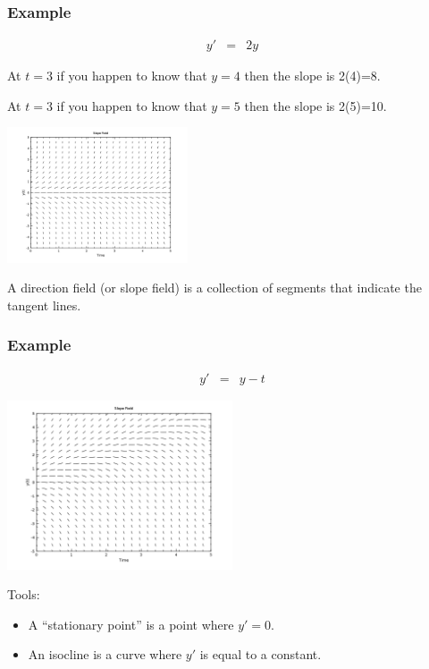 \begin{frame}
  \frametitle{Example}

  \vspace*{-4em}

  \begin{eqnarray*}
    y' & = & 2y
  \end{eqnarray*}

  At $t=3$ if you happen to know that $y=4$ then the slope is 2(4)=8.

  At $t=3$ if you happen to know that $y=5$ then the slope is 2(5)=10.

  \includegraphics[height=4cm]{img/week1Day2SlopeField}

  {\color{red}A direction field (or slope field) is a collection of 
  segments that indicate the tangent lines.} 
  
\end{frame}


\begin{frame}
  \frametitle{Example}

  \vspace*{-4em}

  \begin{eqnarray*}
    y' & = & y - t
  \end{eqnarray*}

  \includegraphics[height=5cm]{img/week1Day2SlopeField2}

  Tools:
  \begin{itemize}
  \item A ``{\color{red}stationary point}'' is a point where $y'=0$.
  \item An {\color{red}isocline} is a curve where $y'$ is equal to a constant.
  \end{itemize}

\end{frame}


